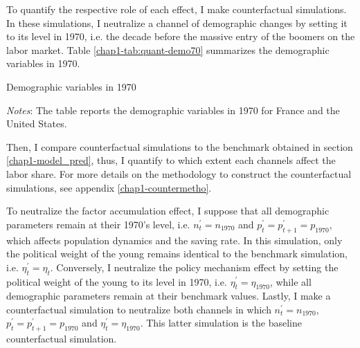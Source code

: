 To quantify the respective role of each effect, I make counterfactual simulations. In these simulations, I neutralize a channel of demographic changes by setting it to its level in 1970, i.e. the decade before the massive entry of the boomers on the labor market.
Table \ref{chap1-tab:quant-demo70} summarizes the demographic variables in 1970.
\begin{table}[!tb]
    \centering
    \begin{threeparttable}
        \caption{Demographic variables in 1970} \label{chap1-tab:quant-demo70}
        
        \begin{tablenotes}[flushleft]
            \footnotesize{\item \textit{Notes}: The table reports the demographic variables in 1970 for France and the United States. 
            }
        \end{tablenotes}
    \end{threeparttable}
\end{table}
Then, I compare counterfactual simulations to the benchmark obtained in section \ref{chap1-model_pred}, thus, I quantify to which extent each channels affect the labor share. For more details on the methodology to construct the counterfactual simulations, see appendix \ref{chap1-countermetho}.

To neutralize the factor accumulation effect, I suppose that all demographic parameters remain at their 1970's level, i.e. $n^\prime_t = n_{1970}$ and $p^\prime_t = p^\prime_{t+1} = p_{1970}$, which affects population dynamics and the saving rate. In this simulation, only the political weight of the young remains identical to the benchmark simulation, i.e. $\eta_t^\prime = \eta_t$. Conversely, I neutralize the policy mechanism effect by setting the political weight of the young to its level in 1970, i.e. $\eta^\prime_t = \eta_{1970}$, while all demographic parameters remain at their benchmark values. Lastly, I make a counterfactual simulation to neutralize both channels in which $n^\prime_t = n_{1970}$, $p^\prime_t = p^\prime_{t+1} = p_{1970}$ and $\eta_t^\prime = \eta_{1970}$. This latter simulation is the baseline counterfactual simulation.

